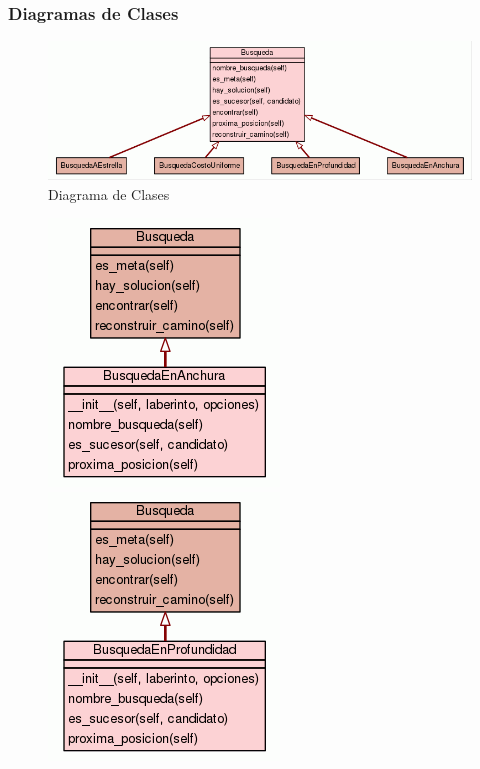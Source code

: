 \documentclass[letter, titlepage, 10pt]{article}
\begin{document}
\subsubsection{Diagramas de Clases}
\begin{figure}[ht]
    \begin{center}
        \includegraphics[scale = 0.5]{images/diagram_busq}
        \caption{Diagrama de Clases}
    \end{center}
\end{figure}

    \begin{figure}[H]
  \centering
    \begin{minipage}{.5\textwidth}
        \centering
        \includegraphics[width=0.45\linewidth]{images/diagram_bea}
    \end{minipage}%
    \begin{minipage}{.5\textwidth}
        \centering
        \includegraphics[width=0.45\linewidth]{images/diagram_bep}
    \end{minipage}
\end{figure}
\end{document}
